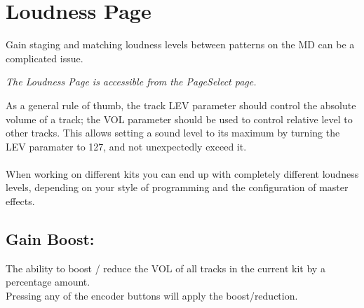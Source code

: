 \chapter{Loudness Page}
Gain staging and matching loudness levels between patterns on the MD can be a complicated issue.

\textit{The Loudness Page is accessible from the PageSelect page.}

As a general rule of thumb, the track LEV parameter should control the absolute volume of a track; the VOL parameter should be used to control relative level to other tracks. This allows setting a sound level to its maximum by turning the LEV paramater to 127, and not unexpectedly exceed it.\\
\\
When working on different kits you can end up with completely different loudness levels, depending on your style of programming and the configuration of master effects.



\section{Gain Boost:}
The ability to boost / reduce the VOL of all tracks in the current kit by a percentage amount.
\\Pressing any of the encoder buttons will apply the boost/reduction.
